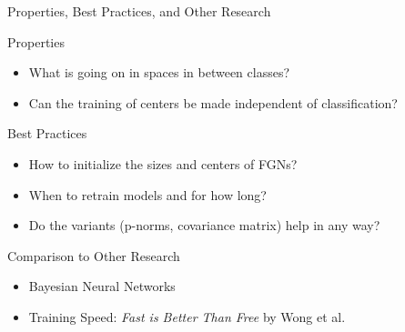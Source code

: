 \documentclass{beamer}
\begin{document}
\begin{frame}{Properties, Best Practices, and Other Research}

    \begin{block}{Properties}
    \begin{itemize}
        \item What is going on in spaces in between classes?
        \item Can the training of centers be made independent of classification?
    \end{itemize}
    \end{block}
    
    \begin{block}{Best Practices}
    \begin{itemize}
        \item How to initialize the sizes and centers of FGNs?
        \item When to retrain models and for how long?
        \item Do the variants (p-norms, covariance matrix) help in any way?
    \end{itemize}
    \end{block}
    
    \begin{block}{Comparison to Other Research}
    \begin{itemize}
        \item Bayesian Neural Networks
        \item Training Speed: \emph{Fast is Better Than Free} \cite{wong2020fast} by Wong et al.


    \end{itemize}
    
    \end{block}
    
\end{frame}
\end{document}
